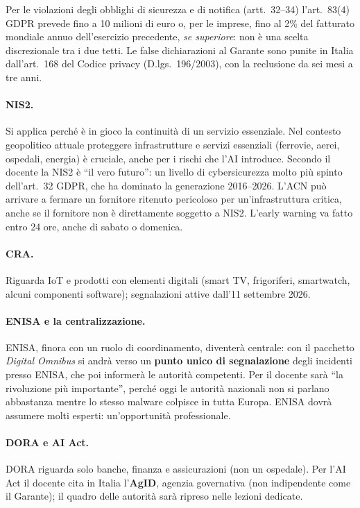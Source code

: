 \begin{integrazione}
Per le violazioni degli obblighi di sicurezza e di notifica (artt.~32--34) l'art.~83(4) GDPR prevede
fino a 10 milioni di euro o, per le imprese, fino al 2\% del fatturato mondiale annuo
dell'esercizio precedente, \emph{se superiore}: non è una scelta discrezionale tra i due tetti. Le
false dichiarazioni al Garante sono punite in Italia dall'art.~168 del Codice privacy
(D.lgs.~196/2003), con la reclusione da sei mesi a tre anni.
\end{integrazione}

\paragraph{NIS2.} Si applica perché è in gioco la continuità di un servizio essenziale. Nel contesto
geopolitico attuale proteggere infrastrutture e servizi essenziali (ferrovie, aerei, ospedali,
energia) è cruciale, anche per i rischi che l'AI introduce. Secondo il docente la NIS2 è ``il vero
futuro'': un livello di cybersicurezza molto più spinto dell'art.~32 GDPR, che ha dominato la
generazione 2016--2026. L'ACN può arrivare a fermare un fornitore ritenuto pericoloso per
un'infrastruttura critica, anche se il fornitore non è direttamente soggetto a NIS2. L'early warning
va fatto entro 24 ore, anche di sabato o domenica.

\paragraph{CRA.} Riguarda IoT e prodotti con elementi digitali (smart TV, frigoriferi, smartwatch,
alcuni componenti software); segnalazioni attive dall'11 settembre 2026.

\paragraph{ENISA e la centralizzazione.} ENISA, finora con un ruolo di coordinamento, diventerà
centrale: con il pacchetto \emph{Digital Omnibus} si andrà verso un \textbf{punto unico di
segnalazione} degli incidenti presso ENISA, che poi informerà le autorità competenti. Per il docente
sarà ``la rivoluzione più importante'', perché oggi le autorità nazionali non si parlano abbastanza
mentre lo stesso malware colpisce in tutta Europa. ENISA dovrà assumere molti esperti: un'opportunità
professionale.

\paragraph{DORA e AI Act.} DORA riguarda solo banche, finanza e assicurazioni (non un ospedale).
Per l'AI Act il docente cita in Italia l'\textbf{AgID}, agenzia governativa (non indipendente come il
Garante); il quadro delle autorità sarà ripreso nelle lezioni dedicate.

